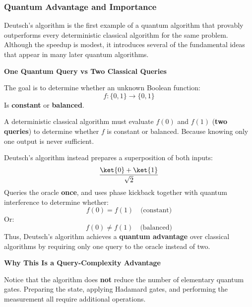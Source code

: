 \subsubsection{Quantum Advantage and Importance}\label{ex:quantum-advantage-and-importance}

Deutsch's algorithm is the first example of a quantum algorithm that provably outperforms every deterministic classical algorithm for the same problem. Although the speedup is modest, it introduces several of the fundamental ideas that appear in many later quantum algorithms.

\highspace
\begin{flushleft}
    \textcolor{Green3}{ \textbf{One Quantum Query vs Two Classical Queries}}
\end{flushleft}
The goal is to determine whether an unknown Boolean function:
\begin{equation*}
    f:\{0,1\}\to\{0,1\}
\end{equation*}
Is \textbf{constant} or \textbf{balanced}.

\highspace
\textcolor{Red2}{} A deterministic classical algorithm must evaluate $f(0)$ and $f(1)$ (\textbf{two queries}) to determine whether $f$ is constant or balanced. Because knowing only one output is never sufficient.

\highspace
\textcolor{Green3}{} Deutsch's algorithm instead prepares a superposition of both inputs:
\begin{equation*}
    \frac{\ket{0} + \ket{1}}{\sqrt{2}}
\end{equation*}
Queries the oracle \textbf{once}, and uses phase kickback together with quantum interference to determine whether:
\begin{equation*}
    f(0) = f(1) \quad \text{(constant)}
\end{equation*}
Or:
\begin{equation*}
    f(0) \neq f(1) \quad \text{(balanced)}
\end{equation*}
Thus, Deutsch's algorithm achieves a \textbf{quantum advantage} over classical algorithms by requiring only one query to the oracle instead of two.

\highspace
\begin{flushleft}
    \textcolor{Green3}{ \textbf{Why This Is a Query-Complexity Advantage}}
\end{flushleft}
Notice that the algorithm does \textbf{not} reduce the number of elementary quantum gates. Preparing the state, applying Hadamard gates, and performing the measurement all require additional operations.

